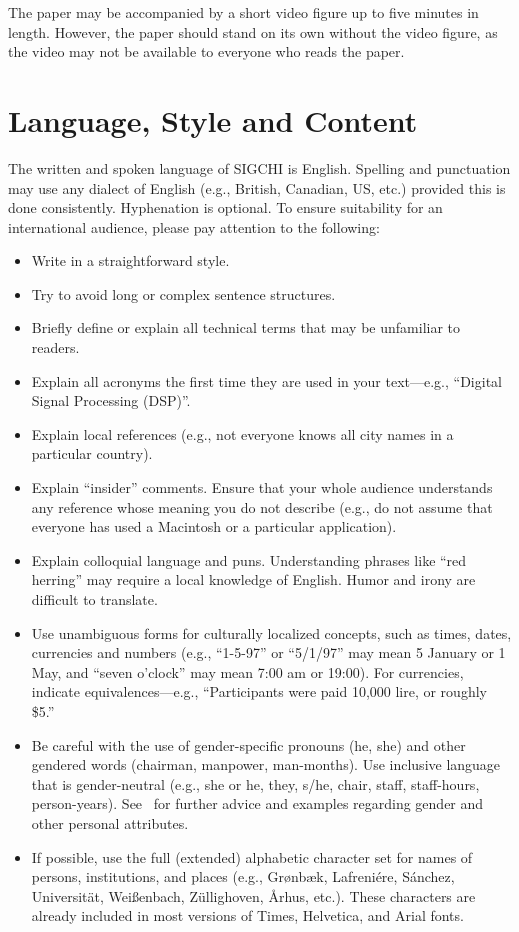 \documentclass{sigchi}
\begin{document}
The paper may be accompanied by a short video figure
up to five minutes in length.  However, the paper should stand on its
own without the video figure, as the video may not be available to
everyone who reads the paper.

\section{Language, Style and Content}

The written and spoken language of SIGCHI is English. Spelling and
punctuation may use any dialect of English (e.g., British, Canadian,
US, etc.) provided this is done consistently. Hyphenation is
optional. To ensure suitability for an international audience, please
pay attention to the following:

\begin{itemize}
\item Write in a straightforward style.
\item Try to avoid long or complex sentence structures.
\item Briefly define or explain all technical terms that may be
  unfamiliar to readers.
\item Explain all acronyms the first time they are used in your text---e.g.,
``Digital Signal Processing (DSP)''.
\item Explain local references (e.g., not everyone knows all city
  names in a particular country).
\item Explain ``insider'' comments. Ensure that your whole audience
  understands any reference whose meaning you do not describe (e.g.,
  do not assume that everyone has used a Macintosh or a particular
  application).
\item Explain colloquial language and puns. Understanding phrases like
  ``red herring'' may require a local knowledge of English.  Humor and
  irony are difficult to translate.
\item Use unambiguous forms for culturally localized concepts, such as
  times, dates, currencies and numbers (e.g., ``1-5-97'' or ``5/1/97''
  may mean 5 January or 1 May, and ``seven o'clock'' may mean 7:00 am or
  19:00).  For currencies, indicate equivalences---e.g., ``Participants
  were paid 10,000 lire, or roughly \$5.''
\item Be careful with the use of gender-specific pronouns (he, she)
  and other gendered words (chairman, manpower, man-months). Use
  inclusive language that is gender-neutral (e.g., she or he, they,
  s/he, chair, staff, staff-hours,
  person-years). See~\cite{Schwartz:1995:GBF} for further advice and
  examples regarding gender and other personal attributes.
\item If possible, use the full (extended) alphabetic character set
  for names of persons, institutions, and places (e.g.,
  Gr{\o}nb{\ae}k, Lafreni\'ere, S\'anchez, Universit{\"a}t,
  Wei{\ss}enbach, Z{\"u}llighoven, \r{A}rhus, etc.).  These characters
  are already included in most versions of Times, Helvetica, and Arial
  fonts.
\end{itemize}
\end{document}
